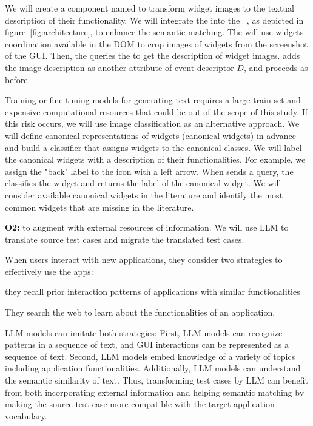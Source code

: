 \smallskip
We will create a component named \imagelabeler to transform widget images to the textual description of their functionality.
We will integrate the \imagelabeler into the \testreuse~\architecture, as depicted in figure~\ref{fig:architecture}, to enhance the semantic matching.
The \ede  will use widgets coordination available in the DOM to crop images of widgets from the screenshot of the GUI.
Then, the \ede queries the \imagelabeler to get the description of  widget images.
\ede adds the image description as another attribute of event descriptor $D$, and \matcher proceeds as before.


\smallskip
Training or fine-tuning models for generating text requires a large train set and expensive computational resources that could be out of the scope of this study. 
If this risk occurs, we will use image classification as an alternative approach.
We will define canonical representations of widgets  (canonical widgets) in advance and build a classifier that assigns widgets to the canonical classes.
We will label the canonical widgets with a description of their functionalities.
For example, we assign the "back" label to the icon with a left arrow.
When \ede sends a query, the \imagelabeler classifies the widget and returns the label of the canonical widget.
We will consider available canonical widgets in the literature and identify the most common widgets that are missing in the literature. 



\bigskip 
\noindent
\textbf{O2:} to augment \testreuse with external resources of information.
We will use LLM to translate source test cases and migrate the translated test cases.

\smallskip
When users interact with new applications, they consider two strategies to effectively use the apps:
\begin{inparaenum}[(i)]
\item they recall prior  interaction patterns of  applications with similar functionalities
\item They search the web to learn about the functionalities of an application.
\end{inparaenum}
LLM models can imitate both strategies:
First, LLM models can recognize patterns in a sequence of text, and GUI interactions can be  represented as a sequence of text. 
Second, LLM models embed knowledge of a variety of topics including application functionalities.
Additionally, LLM models can understand the semantic similarity of text. 
Thus, transforming test cases by LLM can benefit from both incorporating external information and helping semantic matching by making the source test case more compatible with the target application vocabulary.



